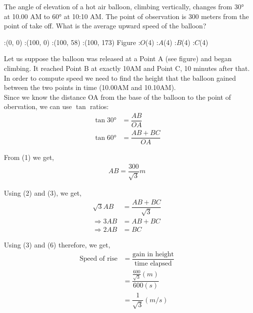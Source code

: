 

\question[5]  The angle of elevation of a hot air balloon, climbing vertically, 
changes from $\ang{30}$ at 10.00 AM to $\ang{60}$ at 10:10 AM. The point of observation 
is 300 meters from the point of take off. What is the average upward speed of the balloon?


\ifprintanswers
	\begin{marginfigure}
		:(0, 0)
		:(100, 0)
		:(100, 58)
		:(100, 173)
		\figdrawbegin{}
			\figdrawline[1,2,3,4,1]
			\figdrawline[3,1]
		\figdrawend
		\figvisu{\figBoxA} {Figure}
		{
			:$O$(4)
			:$A$(4)
			:$B$(4)
			:$C$(4)
		}
		\centerline{\box\figBoxA}
	\end{marginfigure}
\fi 

\begin{solution}[\fullpage]
	Let us suppose the balloon was released at a Point A (see figure) and began climbing. It reached Point B at exactly 10AM and Point C, 10 minutes after that. In order to compute speed we need to find the height that the balloon gained between the two points in time (10.00AM and 10.10AM). \\
	Since we know the distance OA from the base of the balloon to the point of obervation, we can use $\tan$ ratios:
	\begin{align}
		\tan\ang{30} &= \dfrac{AB}{OA}	\\		
		\tan\ang{60} &= \dfrac{AB+BC}{OA}
	\end{align}
	
	From (1) we get,
	\begin{align}
		AB = \dfrac{300}{\sqrt{3}} m
	\end{align}	
	
	Using (2) and (3), we get,
	\begin{align}
		\sqrt{3}AB &= \dfrac{AB+BC}{\sqrt{3}}	\\		
		\Rightarrow 3AB &= AB+BC				\\
		\Rightarrow 2AB &= BC
	\end{align}

	Using (3) and (6) therefore, we get,
	\begin{align}
		\text{Speed of rise} &= \dfrac{\text{gain in height}}{\text{time elapsed}} \\
							 &= \dfrac{\frac{600}{\sqrt{3}}(m)}{600(s)}	\\
							 &= \dfrac{1}{\sqrt{3}}(m/s)
	\end{align}	
		
\end{solution}
